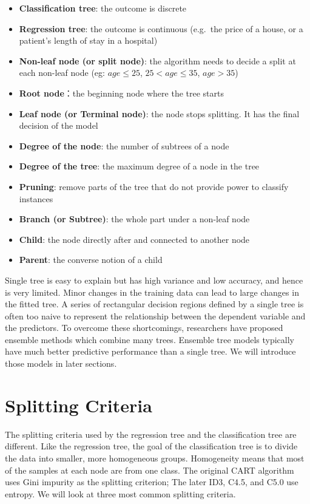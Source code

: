 \documentclass[12pt,]{krantz}
\providecommand{\tightlist}{%
  \setlength{\itemsep}{0pt}\setlength{\parskip}{0pt}}
\theoremstyle{definition}
\theoremstyle{definition}
\theoremstyle{definition}
\theoremstyle{remark}
\begin{document}
\begin{itemize}
\tightlist
\item
  \textbf{Classification tree}: the outcome is discrete
\item
  \textbf{Regression tree}: the outcome is continuous (e.g.~the price of
  a house, or a patient's length of stay in a hospital)
\item
  \textbf{Non-leaf node (or split node)}: the algorithm needs to decide
  a split at each non-leaf node (eg: \(age \leq 25\),
  \(25 < age \leq 35\), \(age > 35\))
\item
  \textbf{Root node}：the beginning node where the tree starts
\item
  \textbf{Leaf node (or Terminal node)}: the node stops splitting. It
  has the final decision of the model
\item
  \textbf{Degree of the node}: the number of subtrees of a node
\item
  \textbf{Degree of the tree}: the maximum degree of a node in the tree
\item
  \textbf{Pruning}: remove parts of the tree that do not provide power
  to classify instances
\item
  \textbf{Branch (or Subtree)}: the whole part under a non-leaf node
\item
  \textbf{Child}: the node directly after and connected to another node
\item
  \textbf{Parent}: the converse notion of a child
\end{itemize}

Single tree is easy to explain but has high variance and low accuracy,
and hence is very limited. Minor changes in the training data can lead
to large changes in the fitted tree. A series of rectangular decision
regions defined by a single tree is often too naive to represent the
relationship between the dependent variable and the predictors. To
overcome these shortcomings, researchers have proposed ensemble methods
which combine many trees. Ensemble tree models typically have much
better predictive performance than a single tree. We will introduce
those models in later sections.

\section{Splitting Criteria}\label{splitting-criteria}

The splitting criteria used by the regression tree and the
classification tree are different. Like the regression tree, the goal of
the classification tree is to divide the data into smaller, more
homogeneous groups. Homogeneity means that most of the samples at each
node are from one class. The original CART algorithm uses Gini impurity
as the splitting criterion; The later ID3, C4.5, and C5.0 use entropy.
We will look at three most common splitting criteria.
\end{document}
